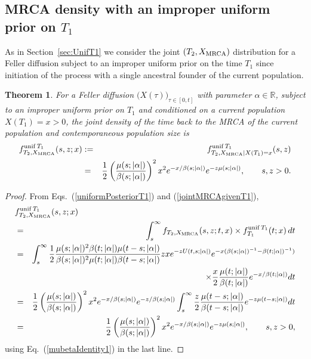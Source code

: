 \documentclass[preprint,12pt]{elsarticle}
\newtheorem{theorem}{Theorem}
\begin{document}

\subsection{MRCA density with an improper uniform prior on $T_1$}

As in Section~\ref{sec:UnifT1} we consider the joint $(T_2, X_{\rm MRCA})$ distribution  for a Feller diffusion subject to an improper 
uniform prior on the time $T_1$ since initiation of the process with a single ancestral founder of the current population.  

\begin{theorem}
For a Feller diffusion $\big(X(\tau)\big)_{\tau \in [0, t]}$ with parameter $\alpha \in \mathbb{R}$, subject to an improper uniform prior on $T_1$ 
and conditioned on a current population $X(T_1) = x > 0$, the joint density of the time back to the MRCA of the current population and 
contemporaneous population size is 
\begin{eqnarray}	\label{jointMRCAUnifT1}
f^{{\rm unif}\,T_1}_{T_2, X_{\rm MRCA}}(s, z; x) & := &f^{{\rm unif}\,T_1}_{T_2, X_{\rm MRCA} \mid X(T_1) = x}(s, z) \nonumber \\
	& = & \frac{1}{2} \left(\frac{\mu(s; |\alpha|)}{\beta(s; |\alpha|)}\right)^2 x^2 e^{-x/\beta(s; |\alpha|)} e^{-z \mu(s; |\alpha|)}, \qquad s, z > 0.
\end{eqnarray}
\end{theorem}
%
\begin{proof}
From Eqs.~(\ref{uniformPosteriorT1}) and (\ref{jointMRCAgivenT1}), 
\begin{eqnarray*}
\lefteqn{f^{{\rm unif}\,T_1}_{T_2, X_{\rm MRCA}}(s, z; x) } \nonumber \\
	& = &\int_s^\infty f_{T_2, X_{\rm MRCA}}(s, z; t, x) \times f^{{\rm unif}\,T_1} _{T_1} (t; x)  \,dt \nonumber \\
	& = &\int_s^\infty \frac{1}{2} \frac{\mu(s; |\alpha|)^2\beta(t; |\alpha|)\mu(t - s; |\alpha|)}{\beta(s; |\alpha|)^2\mu(t; |\alpha|)\beta(t - s; |\alpha|)}
							zxe^{-zU(t, s; |\alpha|)} e^{-x(\beta(s; |\alpha|)^{-1} - \beta(t; |\alpha|)^{-1})}  \nonumber \\
	& &	\qquad\qquad\qquad\qquad\qquad\qquad\qquad\qquad	\times \frac{x}{2} \frac{\mu(t; |\alpha|)}{\beta(t; |\alpha|)} e^{-x/\beta(t; |\alpha|)} dt  \nonumber \\
	& = & \frac{1}{2} \left(\frac{\mu(s; |\alpha|)}{\beta(s; |\alpha|)}\right)^2 x^2 e^{-x/\beta(s; |\alpha|)} e^{-z/\beta(s; |\alpha|)} 
									\int_s^\infty \frac{z}{2} \frac{\mu(t - s; |\alpha|)}{\beta(t - s; |\alpha|)} e^{-z\mu(t - s; |\alpha|)} dt  \nonumber \\
	& = & \frac{1}{2} \left(\frac{\mu(s; |\alpha|)}{\beta(s; |\alpha|)}\right)^2 x^2 e^{-x/\beta(s; |\alpha|)} e^{-z \mu(s; |\alpha|)}, \qquad s, z > 0,
\end{eqnarray*}
using Eq.~(\ref{mubetaIdentity1}) in the last line.  
\end{proof}
\end{document}
